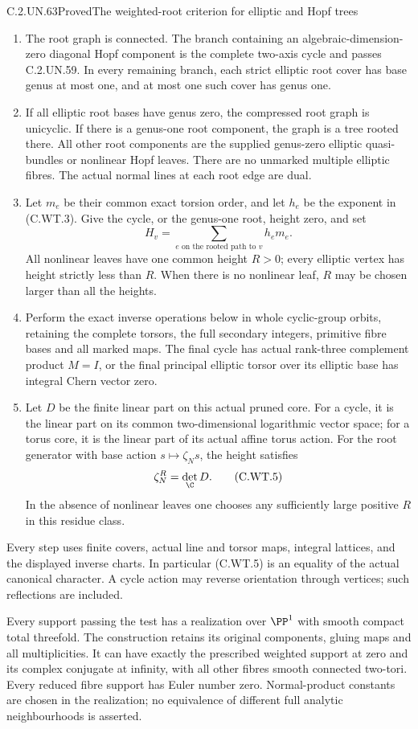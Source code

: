 \begin{statement}{C.2.UN.63}{Proved}{The weighted-root criterion for elliptic and Hopf trees}
\begin{enumerate}
\item The root graph is connected. The branch containing an
algebraic-dimension-zero diagonal Hopf component is the complete
two-axis cycle and passes C.2.UN.59. In every remaining branch,
each strict elliptic root cover has base genus at most one, and
at most one such cover has genus one.
\item If all elliptic root bases have genus zero, the compressed
root graph is unicyclic. If there is a genus-one root component,
the graph is a tree rooted there. All other root components are
the supplied genus-zero elliptic quasi-bundles or nonlinear
Hopf leaves. There are no unmarked multiple elliptic fibres.
The actual normal lines at each root edge are dual.
\item Let \(m_e\) be their common exact torsion order, and let
\(h_e\) be the exponent in (C.WT.3). Give the cycle, or the
genus-one root, height zero, and set
\[
       H_v=\sum_{e\text{ on the rooted path to }v}h_e m_e.
 \tag{C.WT.4}
\]
All nonlinear leaves have one common height \(R>0\);
every elliptic vertex has height strictly less than \(R\).
When there is no nonlinear leaf, \(R\) may be chosen larger
than all the heights.
\item Perform the exact inverse operations below in whole
cyclic-group orbits, retaining the complete torsors, the full
secondary integers, primitive fibre bases and all marked maps.
The final cycle has actual rank-three complement product
\(M=I\), or the final principal elliptic torsor over its
elliptic base has integral Chern vector zero.
\item Let \(D\) be the finite linear part on this actual pruned
core. For a cycle, it is the linear part on its common
two-dimensional logarithmic vector space; for a torus core,
it is the linear part of its actual affine torus action.
For the root generator with base action \(s\mapsto\zeta_Ns\),
the height satisfies
\[
                         \zeta_N^R=\det_{\C}D.
 \tag{C.WT.5}
\]
In the absence of nonlinear leaves one chooses any sufficiently
large positive \(R\) in this residue class.
\end{enumerate}

Every step uses finite covers, actual line and torsor maps,
integral lattices, and the displayed inverse charts. In
particular (C.WT.5) is an equality of the actual canonical
character. A cycle action may reverse orientation through
vertices; such reflections are included.

Every support passing the test has a realization over
\(\PP^1\) with smooth compact total threefold. The construction
retains its original components, gluing maps and all
multiplicities. It can have exactly the prescribed weighted
support at zero and its complex conjugate at infinity, with
all other fibres smooth connected two-tori. Every reduced
fibre support has Euler number zero. Normal-product constants
are chosen in the realization; no equivalence of different
full analytic neighbourhoods is asserted.
\end{statement}


